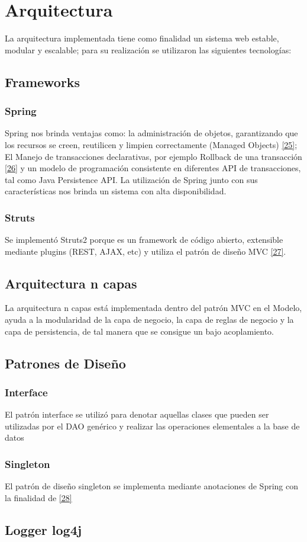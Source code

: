 \chapter{Arquitectura} \label{cap:seis}

La arquitectura implementada tiene como finalidad un sistema web estable, modular y escalable; para su realización se utilizaron las siguientes tecnologías:

\section{Frameworks}
\subsection {Spring}
Spring nos brinda ventajas como: la administración de objetos, garantizando que los recursos se creen, reutilicen y limpien correctamente (Managed Objects) \hyperlink{b25}{[25]}; El Manejo de transacciones declarativas, por ejemplo Rollback de una transacción \hyperlink{b26}{[26]} y un modelo de programación consistente en diferentes API de transacciones, tal como Java Persistence API.
La utilización de Spring junto con sus características nos brinda un sistema con alta disponibilidad.

\subsection {Struts}
Se implementó Struts2 porque es un framework de código abierto, extensible mediante plugins (REST, AJAX, etc) y utiliza el patrón de diseño MVC \hyperlink{b27}{[27]}.

\section{Arquitectura n capas}
La arquitectura n capas está implementada dentro del patrón MVC en el Modelo, ayuda a la modularidad de la capa de negocio, la capa de reglas de negocio y la capa de persistencia, de tal manera que se consigue un bajo acoplamiento.


\section{Patrones de Diseño}
\subsection{Interface}
El patrón interface se utilizó para denotar aquellas clases que pueden ser utilizadas por el DAO genérico y realizar las operaciones elementales a la base de datos


\subsection{Singleton}
El patrón de diseño singleton se implementa mediante anotaciones de Spring con la finalidad de \hyperlink{b28}{[28]}

\section{Logger log4j}



